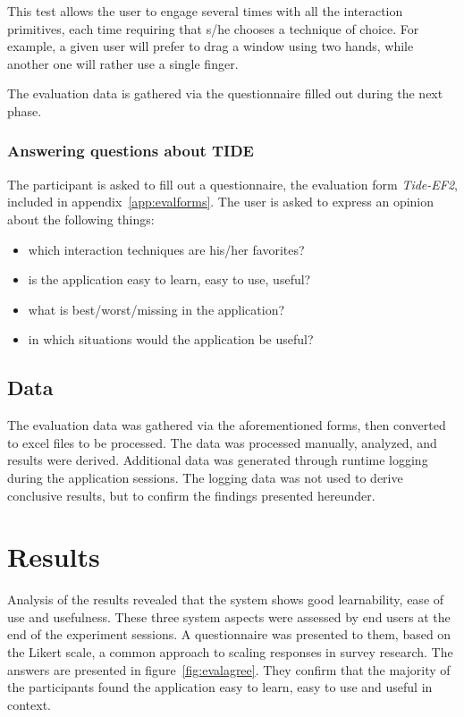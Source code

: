 This test allows the user to engage several times with all the interaction primitives, each time requiring that s/he chooses a technique of choice.
For example, a given user will prefer to drag a window using two hands, while another one will rather use a single finger.

The evaluation data is gathered via the questionnaire filled out during the next phase.

\subsubsection{Answering questions about TIDE}

The participant is asked to fill out a questionnaire, the evaluation form \emph{Tide-EF2}, included in appendix~\ref{app:evalforms}.
The user is asked to express an opinion about the following things:
\begin{itemize}
\item which interaction techniques are his/her favorites?
\item is the application easy to learn, easy to use, useful?
\item what is best/worst/missing in the application?
\item in which situations would the application be useful? 
\end{itemize}

\subsection{Data}

The evaluation data was gathered via the aforementioned forms, then converted to excel files to be processed.
The data was processed manually, analyzed, and results were derived.
Additional data was generated through runtime logging during the application sessions.
The logging data was not used to derive conclusive results, but to confirm the findings presented hereunder. 

\section{Results}
\label{sec:results}

Analysis of the results revealed that the system shows good learnability, ease of use and usefulness.
These three system aspects were assessed by end users at the end of the experiment sessions.
A questionnaire was presented to them, based on the Likert scale, a common approach to scaling responses in survey research.
The answers are presented in figure~\ref{fig:evalagree}.
They confirm that the majority of the participants found the application easy to learn, easy to use and useful in context.

